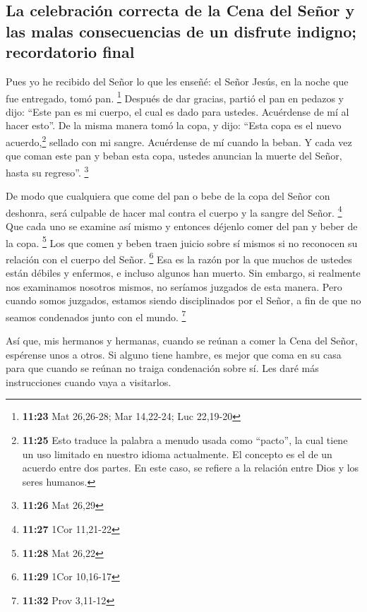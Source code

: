 \hypertarget{la-celebraciuxf3n-correcta-de-la-cena-del-seuxf1or-y-las-malas-consecuencias-de-un-disfrute-indigno-recordatorio-final}{%
\subsection{La celebración correcta de la Cena del Señor y las malas
consecuencias de un disfrute indigno; recordatorio
final}\label{la-celebraciuxf3n-correcta-de-la-cena-del-seuxf1or-y-las-malas-consecuencias-de-un-disfrute-indigno-recordatorio-final}}

 Pues yo he recibido del Señor lo que les enseñé: el
Señor Jesús, en la noche que fue entregado, tomó pan. \footnote{\textbf{11:23}
  Mat 26,26-28; Mar 14,22-24; Luc 22,19-20}  Después de
dar gracias, partió el pan en pedazos y dijo: ``Este pan es mi cuerpo,
el cual es dado para ustedes. Acuérdense de mí al hacer esto''.
 De la misma manera tomó la copa, y dijo: ``Esta copa es
el nuevo acuerdo,\footnote{\textbf{11:25} Esto traduce la palabra a
  menudo usada como ``pacto'', la cual tiene un uso limitado en nuestro
  idioma actualmente. El concepto es el de un acuerdo entre dos partes.
  En este caso, se refiere a la relación entre Dios y los seres humanos.}
sellado con mi sangre. Acuérdense de mí cuando la beban. 
Y cada vez que coman este pan y beban esta copa, ustedes anuncian la
muerte del Señor, hasta su regreso''. \footnote{\textbf{11:26} Mat 26,29}

 De modo que cualquiera que come del pan o bebe de la
copa del Señor con deshonra, será culpable de hacer mal contra el cuerpo
y la sangre del Señor. \footnote{\textbf{11:27} 1Cor 11,21-22}
 Que cada uno se examine así mismo y entonces déjenlo
comer del pan y beber de la copa. \footnote{\textbf{11:28} Mat 26,22}
 Los que comen y beben traen juicio sobre sí mismos si no
reconocen su relación con el cuerpo del Señor. \footnote{\textbf{11:29}
  1Cor 10,16-17}  Esa es la razón por la que muchos de
ustedes están débiles y enfermos, e incluso algunos han muerto.
 Sin embargo, si realmente nos examinamos nosotros
mismos, no seríamos juzgados de esta manera.  Pero cuando
somos juzgados, estamos siendo disciplinados por el Señor, a fin de que
no seamos condenados junto con el mundo. \footnote{\textbf{11:32} Prov
  3,11-12}

 Así que, mis hermanos y hermanas, cuando se reúnan a
comer la Cena del Señor, espérense unos a otros.  Si
alguno tiene hambre, es mejor que coma en su casa para que cuando se
reúnan no traiga condenación sobre sí. Les daré más instrucciones cuando
vaya a visitarlos.

